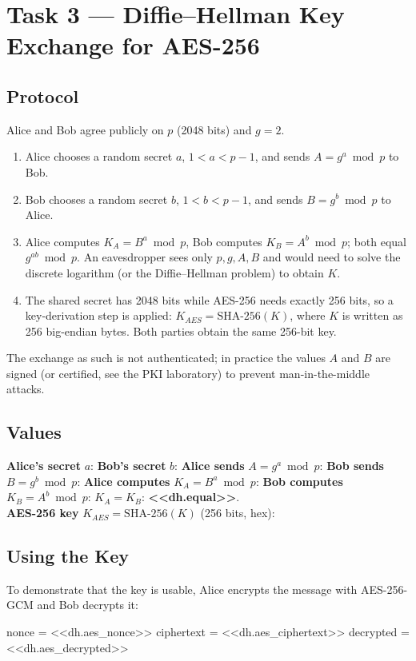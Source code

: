 \documentclass[12pt,a4paper]{article}
\begin{document}
\section{Task 3 — Diffie–Hellman Key Exchange for AES-256}
\subsection{Protocol}
Alice and Bob agree publicly on $p$ (2048 bits) and $g=2$.
\begin{enumerate}
  \item Alice chooses a random secret $a$, $1<a<p-1$, and sends $A = g^{a} \bmod p$ to Bob.
  \item Bob chooses a random secret $b$, $1<b<p-1$, and sends $B = g^{b} \bmod p$ to Alice.
  \item Alice computes $K_A = B^{a} \bmod p$, Bob computes $K_B = A^{b} \bmod p$; both equal
        $g^{ab} \bmod p$. An eavesdropper sees only $p,g,A,B$ and would need to solve the
        discrete logarithm (or the Diffie–Hellman problem) to obtain $K$.
  \item The shared secret has 2048 bits while AES-256 needs exactly 256 bits, so a key-derivation
        step is applied: $K_{AES} = \mathrm{SHA\text{-}256}(K)$, where $K$ is written as 256
        big-endian bytes. Both parties obtain the same 256-bit key.
\end{enumerate}
The exchange as such is not authenticated; in practice the values $A$ and $B$ are signed (or
certified, see the PKI laboratory) to prevent man-in-the-middle attacks.

\subsection{Values}
\noindent\textbf{Alice's secret} $a$:
\noindent\textbf{Bob's secret} $b$:
\noindent\textbf{Alice sends} $A = g^{a} \bmod p$:
\noindent\textbf{Bob sends} $B = g^{b} \bmod p$:
\noindent\textbf{Alice computes} $K_A = B^{a} \bmod p$:
\noindent\textbf{Bob computes} $K_B = A^{b} \bmod p$:
$K_A = K_B$: \textbf{<<dh.equal>>}.\\[4pt]
\noindent\textbf{AES-256 key} $K_{AES}=\mathrm{SHA\text{-}256}(K)$ (256 bits, hex):

\subsection{Using the Key}
To demonstrate that the key is usable, Alice encrypts the message with AES-256-GCM and Bob decrypts it:
\begin{terminal}
\begin{termout}
nonce      = <<dh.aes_nonce>>
ciphertext = <<dh.aes_ciphertext>>
decrypted  = <<dh.aes_decrypted>>
\end{termout}
\end{terminal}
\end{document}
